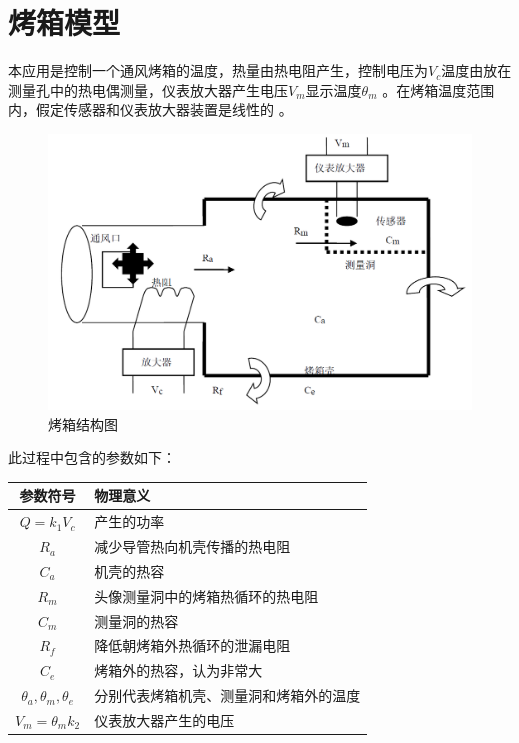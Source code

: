 \documentclass[11pt]{article}
\begin{document}
\newpage

\setcounter{tocdepth}{3}
\tableofcontents
\newpage

\setcounter{page}{1}
\section{烤箱模型}
本应用是控制一个通风烤箱的温度，热量由热电阻产生，控制电压为$V_c$温度由放在测量孔中的热电偶测量，仪表放大器产生电压$V_m $显示温度$ \theta_m$ 。在烤箱温度范围内，假定传感器和仪表放大器装置是线性的 。
\begin{figure}[H]
  \centering
  \includegraphics[width=1.0\textwidth]{烤箱结构图.png}
  \caption{烤箱结构图}
  \label{fig:烤箱结构图}
\end{figure}
此过程中包含的参数如下：
\begin{table}[H]
  \centering
  \renewcommand{\arraystretch}{1.5}
  \begin{tabular}{c|l}
    \hline
    参数符号                         & 物理意义                \\
    \hline
    $Q=k_1V_c$                   & 产生的功率               \\
    $R_a$                        & 减少导管热向机壳传播的热电阻      \\
    $C_a$                        & 机壳的热容               \\
    $R_m$                        & 头像测量洞中的烤箱热循环的热电阻    \\
    $C_m$                        & 测量洞的热容              \\
    $R_f$                        & 降低朝烤箱外热循环的泄漏电阻      \\
    $C_e$                        & 烤箱外的热容，认为非常大        \\
    $\theta_a,\theta_m,\theta_e$ & 分别代表烤箱机壳、测量洞和烤箱外的温度 \\
    $V_m=\theta_mk_2$            & 仪表放大器产生的电压          \\
    \hline
  \end{tabular}
\end{table}
\end{document}
